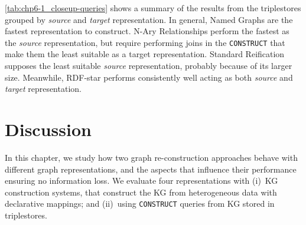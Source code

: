 \cref{tab:chp6-1_closeup-queries} shows a summary of the results from the triplestores grouped by \textit{source} and \textit{target} representation. In general, Named Graphs are the fastest representation to construct. %
N-Ary Relationships perform the fastest as the \textit{source} representation, but require performing joins in the \texttt{CONSTRUCT} that make them the least suitable as a target representation. 
Standard Reification supposes the least suitable \textit{source} representation, probably because of its larger size. 
Meanwhile, RDF-star performs consistently well acting as both \textit{source} and \textit{target} representation.











\section{Discussion}
\label{sec:chp6-1_discussion}

In this chapter, %
we study how two graph re-construction approaches behave with different graph representations, and the aspects that influence their performance ensuring no information loss.
We evaluate four representations with (i)~KG construction systems, that construct the KG from heterogeneous data with declarative mappings; and (ii)~using \texttt{CONSTRUCT} queries from KG stored in triplestores.

